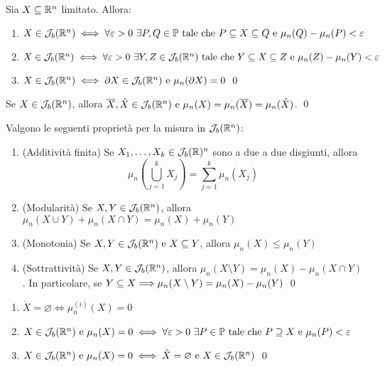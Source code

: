 \begin{theorem}
    Sia $X\subseteq \mathbb{R}^n$ limitato. Allora:
    \begin{enumerate}
        \item $X\in \mathcal{J}_b(\mathbb{R}^n) \iff \forall \varepsilon > 0 \ \exists P,Q \in \mathbb{P} \text{ tale che } P \subseteq X \subseteq Q \text{ e } \mu_n(Q)-\mu_n(P) < \varepsilon$
        \item $X \in \mathcal{J}_b(\mathbb{R}^n) \iff \forall \varepsilon > 0 \ \exists Y,Z \in \mathcal{J}_b(\mathbb{R}^n) \text{ tale che } Y \subseteq X \subseteq Z \text{ e } \mu_n(Z)-\mu_n(Y) < \varepsilon$
        \item $X \in \mathcal{J}_b(\mathbb{R}^n)\iff \partial X \in \mathcal{J}_b(\mathbb{R}^n) \text{ e } \mu_n(\partial X)=0$
        \qed
    \end{enumerate}
\end{theorem}

\begin{corollary}
    Se $X \in \mathcal{J}_b(\mathbb{R}^n)$, allora $\overline{X},\mathring X \in \mathcal{J}_b(\mathbb{R}^n) \text{ e } \mu_n(X)=\mu_n(\overline{X})=\mu_n(\mathring X)$.
    \qed
\end{corollary}

\begin{theorem}
    [Proprietà di $\J_b(\R^n)$]
    Valgono le seguenti proprietà per la misura in $\J_b(\R^n)$:
    \begin{enumerate}
        \item (Additività finita) Se $X_1,\dots,X_k \in \mathcal{J}_b(\mathbb{R})^n$ sono a due a due disgiunti, allora
        $$
            \mu_n\left(\displaystyle \bigcup_{j=1}^kX_j\right) =   \displaystyle\sum_{j=1}^k\mu_n(X_j)
        $$
        \item (Modularità) Se $X,Y \in \mathcal{J}_b(\mathbb{R}^n)$, allora $\mu_n(X\cup Y)+\mu_n(X\cap Y)=\mu_n(X)+\mu_n(Y)$
        \item (Monotonia) Se $X,Y \in \mathcal{J}_b(\mathbb{R}^n) \text{ e } X \subseteq Y$, allora $\mu_n(X) \leq \mu_n(Y)$
        \item (Sottrattività) Se $X,Y \in \mathcal{J}_b(\mathbb{R}^n)$, allora $\mu_n(X\setminus Y)=\mu_n(X)-\mu_n(X\cap Y)$. In particolare, se $Y \subseteq X \Longrightarrow \mu_n (X \setminus Y)=\mu_n(X)-\mu_n(Y)$
        \qed
    \end{enumerate}
\end{theorem}

\begin{theorem}
    \leavevmode
    \begin{enumerate}
        \item $\mathring X = \varnothing \iff \mu_n^{(i)}(X)=0$
        \item $X \in \mathcal{J}_b(\mathbb{R}^n) \text{ e } \mu_n(X)=0 \iff \forall \varepsilon >0 \ \exists P \in \mathbb{P} \text{ tale che } P \supseteq X \text{ e } \mu_n(P)< \varepsilon$
        \item $X \in \mathcal{J}_b(\mathbb{R}^n) \text{ e } \mu_n(X)=0 \iff \mathring X = \varnothing \text{ e } X \in \mathcal{J}_b(\mathbb{R}^n)$
        \qed
    \end{enumerate}
\end{theorem}

